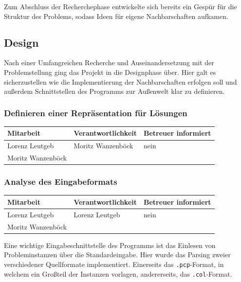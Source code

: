 Zum Abschluss der Recherchephase entwickelte sich bereits ein Gespür für die Struktur des Problems, sodass Ideen für eigene Nachbarschaften aufkamen. %

\subsection{Design}
Nach einer Umfangreichen Recherche und Auseinandersetzung mit der Problemstellung ging das Projekt in die Designphase über. Hier galt es sicherzustellen wie die Implementierung der Nachbarschaften erfolgen soll und außerdem Schnittstellen des Programms zur Außenwelt klar zu definieren.

\subsubsection{Definieren einer Repräsentation für Lösungen}

\begin{center}
\begin{tabular}{lll}
	Mitarbeit & Verantwortlichkeit & Betreuer informiert \\
	\hline
	Lorenz Leutgeb & Moritz Wanzenböck & nein \\
	Moritz Wanzenböck & & \\
\end{tabular}
\end{center}

\subsubsection{Analyse des Eingabeformats}

\begin{center}
\begin{tabular}{lll}
	Mitarbeit & Verantwortlichkeit & Betreuer informiert \\
	\hline
	Lorenz Leutgeb & Lorenz Leutgeb & nein \\
	Moritz Wanzenböck & & \\
\end{tabular}
\end{center}

Eine wichtige Eingabeschnittstelle des Programms ist das Einlesen von Probleminstanzen über die Standardeingabe. Hier wurde das Parsing zweier verschiedener Quellformate implementiert. Einerseits das \texttt{.pcp}-Format, in welchem ein Großteil der Instanzen vorlagen, andererseits, das \texttt{.col}-Format.

